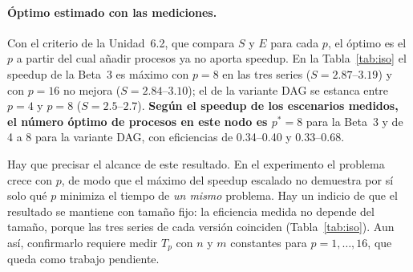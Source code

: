 \documentclass[11pt,a4paper]{article}
\newcommand{\ntr}{n}   %
\newcommand{\mte}{m}   %
\begin{document}
\paragraph{Óptimo estimado con las mediciones.} Con el criterio de la Unidad~6.2, que compara $S$ y
$E$ para cada $p$, el óptimo es el $p$ a partir del cual añadir procesos ya no aporta speedup. En la
Tabla~\ref{tab:iso} el speedup de la Beta~3 es máximo con $p=8$ en las tres series
($S=2.87$--$3.19$) y con $p=16$ no mejora ($S=2.84$--$3.10$); el de la variante DAG se estanca entre
$p=4$ y $p=8$ ($S=2.5$--$2.7$). \textbf{Según el speedup de los escenarios medidos, el número óptimo
de procesos en este nodo es $p^*=8$} para la Beta~3 y de 4 a 8 para la variante DAG, con
eficiencias de 0.34--0.40 y 0.33--0.68.

Hay que precisar el alcance de este resultado. En el experimento el problema crece con $p$, de modo
que el máximo del speedup escalado no demuestra por sí solo qué $p$ minimiza el tiempo de \emph{un
mismo} problema. Hay un indicio de que el resultado se mantiene con tamaño fijo: la eficiencia
medida no depende del tamaño, porque las tres series de cada versión coinciden
(Tabla~\ref{tab:iso}). Aun así, confirmarlo requiere medir $T_p$ con $\ntr$ y $\mte$ constantes para
$p=1,\dots,16$, que queda como trabajo pendiente.
\end{document}
